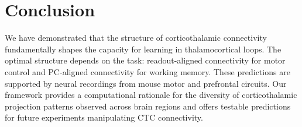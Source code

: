 \documentclass[11pt]{article}
\begin{document}
\section{Conclusion}

We have demonstrated that the structure of corticothalamic connectivity fundamentally shapes the capacity for learning in thalamocortical loops. The optimal structure depends on the task: readout-aligned connectivity for motor control and PC-aligned connectivity for working memory. These predictions are supported by neural recordings from mouse motor and prefrontal circuits. Our framework provides a computational rationale for the diversity of corticothalamic projection patterns observed across brain regions and offers testable predictions for future experiments manipulating CTC connectivity.



\end{document}
